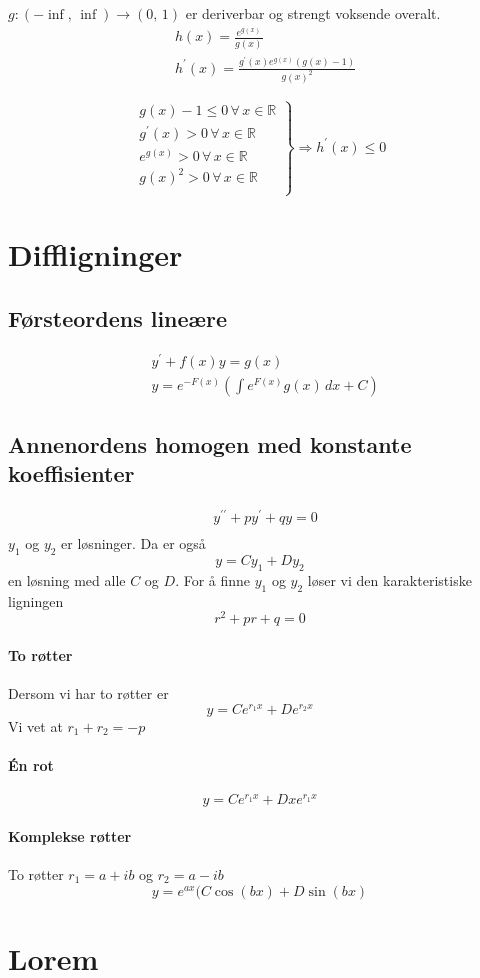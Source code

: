 \documentclass[defaultpackages]{cheatsheet}
\begin{document}
	\subsubsection{}
	$g : (-\inf,\,\inf) \to (0,\,1)$ er deriverbar og strengt voksende overalt.
	\begin{align*}
		&h(x) = \frac{e^{g(x)}}{g(x)}\\
		&h^\prime(x) = \frac{g^\prime(x)e^{g(x)}(g(x)-1)}{g(x)^2}
	\end{align*}

	\[
	 \left.
	\begin{array}{ll}
		g(x)- 1 \le 0\,\forall\,x \in \mathbb{R}\\
		g^\prime(x) > 0\,\forall\,x \in \mathbb{R}\\
		e^{g(x)} > 0\,\forall\,x \in \mathbb{R}\\
		g(x)^2 > 0\,\forall\,x \in \mathbb{R}\\
	\end{array}
	\right \}\Rightarrow h^\prime(x)\le 0 \]
	\section{Diffligninger}
	\subsection{Førsteordens lineære}
	\begin{align*}
		&y^\prime + f(x)y = g(x)\\
		&y = e^{-F(x)}\left(\int e^{F(x)}g(x)\,dx + C\right)
	\end{align*}
\subsection{Annenordens homogen med konstante koeffisienter}
\begin{align*}
	&y^{\prime\prime}+py^\prime+qy=0\\
\end{align*}
	$y_1$ og $y_2$ er løsninger. Da er også
	$$y = Cy_1 + Dy_2$$
	en løsning med alle $C$ og $D$.
	For å finne $y_1$ og $y_2$ løser vi den karakteristiske ligningen
	\[r^2+pr + q = 0\]
	\paragraph{To røtter}
	Dersom vi har to røtter er
	\[y = Ce^{r_1x} + De^{r_2x}\]
	Vi vet at $r_1+r_2=-p$
	\paragraph{\'En rot}
	\[y=Ce^{r_1x}+Dxe^{r_1x}\]
	\paragraph{Komplekse røtter}
	To røtter $r_1=a+ib$ og $r_2 = a-ib$
	\[y=e^{ax}(C\cos(bx)+D\sin (bx)\]
	
	
	
	
	
	\section{Lorem}
	\lipsum[1-40]
\end{document}
